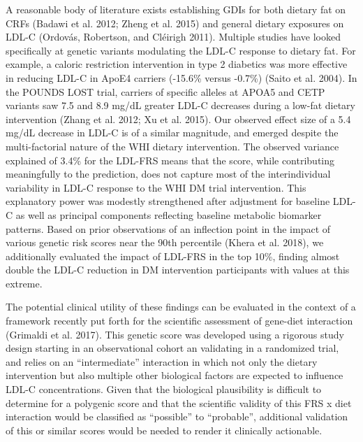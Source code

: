 \documentclass[]{article}
\begin{document}
A reasonable body of literature exists establishing GDIs for both
dietary fat on CRFs (Badawi et al. 2012; Zheng et al. 2015) and general
dietary exposures on LDL-C (Ordovás, Robertson, and Cléirigh 2011).
Multiple studies have looked specifically at genetic variants modulating
the LDL-C response to dietary fat. For example, a caloric restriction
intervention in type 2 diabetics was more effective in reducing LDL-C in
ApoE4 carriers (-15.6\% versus -0.7\%) (Saito et al. 2004). In the
POUNDS LOST trial, carriers of specific alleles at APOA5 and CETP
variants saw 7.5 and 8.9 mg/dL greater LDL-C decreases during a low-fat
dietary intervention (Zhang et al. 2012; Xu et al. 2015). Our observed
effect size of a 5.4 mg/dL decrease in LDL-C is of a similar magnitude,
and emerged despite the multi-factorial nature of the WHI dietary
intervention. The observed variance explained of 3.4\% for the LDL-FRS
means that the score, while contributing meaningfully to the prediction,
does not capture most of the interindividual variability in LDL-C
response to the WHI DM trial intervention. This explanatory power was
modestly strengthened after adjustment for baseline LDL-C as well as
principal components reflecting baseline metabolic biomarker patterns.
Based on prior observations of an inflection point in the impact of
various genetic risk scores near the 90th percentile (Khera et al.
2018), we additionally evaluated the impact of LDL-FRS in the top 10\%,
finding almost double the LDL-C reduction in DM intervention
participants with values at this extreme.

The potential clinical utility of these findings can be evaluated in the
context of a framework recently put forth for the scientific assessment
of gene-diet interaction (Grimaldi et al. 2017). This genetic score was
developed using a rigorous study design starting in an observational
cohort an validating in a randomized trial, and relies on an
``intermediate'' interaction in which not only the dietary intervention
but also multiple other biological factors are expected to influence
LDL-C concentrations. Given that the biological plausibility is
difficult to determine for a polygenic score and that the scientific
validity of this FRS x diet interaction would be classified as
``possible'' to ``probable'', additional validation of this or similar
scores would be needed to render it clinically actionable.
\end{document}

